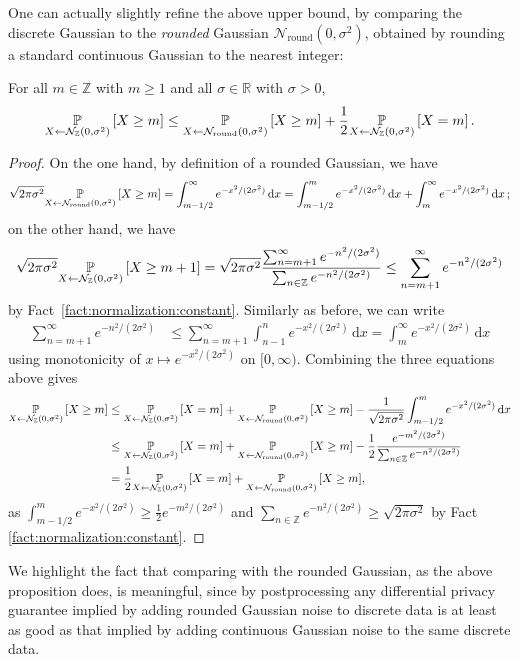 \documentclass{jpc}
\newcommand{\roundN}{\mathcal{N}_{\text{round}}}
\newcommand{\dgausss}[2]{{\discN\left(#1,#2\right)}}
\newcommand{\dgauss}[1]{\dgausss{0}{#1}}
\newcommand{\pr}[2]{{\ifx&#1& \mathbb{P} \else
\underset{#1}{\mathbb{P}} \fi \left[#2\right]}}
\newcommand{\dx}[1][x]{\mathrm{d}#1}
\newcommand{\Z}{\mathbb{Z}}
\newcommand{\R}{\mathbb{R}}
\begin{document}
One can actually slightly refine the above upper bound, by comparing the discrete Gaussian to the \emph{rounded} Gaussian $\roundN(0,\sigma^2)$, obtained by rounding a standard continuous Gaussian to the nearest integer:
\begin{prop}\label{prop:upper:bound:gaussian:2}
For all $m \in \Z$ with $m \ge 1$ and all $\sigma \in \R$ with $\sigma>0$, 
\[
    \pr{X \gets \dgauss{\sigma^2}}{X \ge m} 
\le \pr{X \gets \roundN(0,\sigma^2)}{X \ge m} 
            + \frac{1}{2}\pr{X \gets \dgauss{\sigma^2}}{X = m}\,.
\]
\end{prop}
\begin{proof}
On the one hand, by definition of a rounded Gaussian, we have
\[
\sqrt{2\pi\sigma^2}\pr{X \gets \roundN(0,\sigma^2)}{X \ge m}
= \int_{m-1/2}^\infty e^{-x^2/(2\sigma^2)}\, \dx
= \int_{m-1/2}^m e^{-x^2/(2\sigma^2)}\, \dx + \int_{m}^\infty e^{-x^2/(2\sigma^2)}\, \dx\,;
\]
on the other hand, we have
\[
    \sqrt{2\pi\sigma^2}\pr{X \gets \dgauss{\sigma^2}}{X \ge m+1} 
    = \sqrt{2\pi\sigma^2}\frac{\sum_{n=m+1}^\infty e^{-n^2/(2\sigma^2)}}{\sum_{n\in\Z} e^{-n^2/(2\sigma^2)}} \leq \sum_{n=m+1}^\infty e^{-n^2/(2\sigma^2)}
\]
by Fact~\ref{fact:normalization:constant}. Similarly as before, we can write
\begin{align*}
\sum_{n=m+1}^\infty e^{-n^2/(2\sigma^2)}
&\leq \sum_{n=m+1}^\infty \int_{n-1}^n e^{-x^2/(2\sigma^2)}\,\dx
= \int_{m}^\infty e^{-x^2/(2\sigma^2)}\,\dx
\end{align*}
using monotonicity of $x\mapsto e^{-x^2/(2\sigma^2)}$ on $[0,\infty)$. Combining the three equations above gives
\begin{align*}
    \pr{X \gets \dgauss{\sigma^2}}{X \ge m} 
    &\leq \pr{X \gets \dgauss{\sigma^2}}{X = m} + \pr{X \gets \roundN(0,\sigma^2)}{X \ge m} - \frac{1}{\sqrt{2\pi\sigma^2}}\int_{m-1/2}^m e^{-x^2/(2\sigma^2)}\, \dx
     \\
    &\leq \pr{X \gets \dgauss{\sigma^2}}{X = m} 
    + \pr{X \gets \roundN(0,\sigma^2)}{X \ge m} - \frac{1}{2}\frac{e^{-m^2/(2\sigma^2) }}{\sum_{n\in\Z} e^{-n^2/(2\sigma^2)} }\\
    &= \frac12 \pr{X \gets \dgauss{\sigma^2}}{X = m} 
    + \pr{X \gets \roundN(0,\sigma^2)}{X \ge m},
\end{align*}
as $\int_{m-1/2}^m e^{-x^2/(2\sigma^2) }\geq \frac{1}{2}e^{-m^2/(2\sigma^2) }$ and $\sum_{n\in\Z} e^{-n^2/(2\sigma^2)} \geq \sqrt{2\pi\sigma^2}$ by Fact \ref{fact:normalization:constant}.
\end{proof}
We highlight the fact that comparing with the rounded Gaussian, as the above proposition does, is meaningful, since by postprocessing any differential privacy guarantee implied by adding rounded Gaussian noise to discrete data is at least as good as that implied by adding continuous Gaussian noise to the same discrete data.
\end{document}
